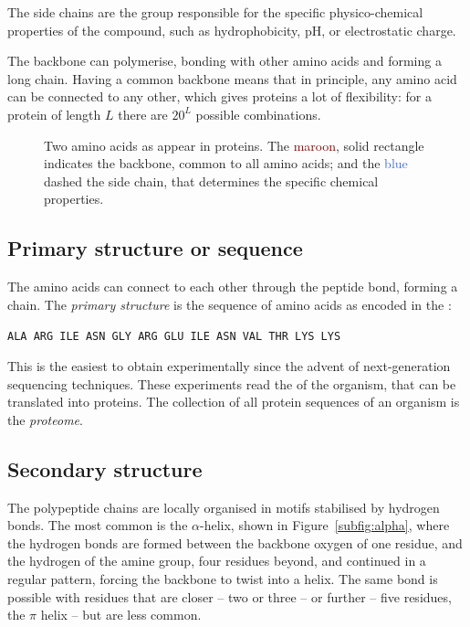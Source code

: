 The side chains are the group responsible for the specific physico-chemical properties of the compound, such as hydrophobicity, pH, or electrostatic charge.

The backbone can polymerise, bonding with other amino acids and forming a long chain.
Having a common backbone means that in principle, any amino acid can be connected to any other, which gives proteins a lot of flexibility:
for a protein of length $L$ there are $20^L$ possible combinations. %

\begin{figure}
\centering
\hfil %
\hfil %
\hfil %
\caption{Two amino acids as appear in proteins.
The \textcolor{Maroon}{maroon}, solid rectangle indicates the backbone, common to all amino acids; and the \textcolor{RoyalBlue}{blue} dashed the side chain, that determines the specific chemical properties.}\label{fig:amino_acids}
\end{figure}

\subsection{Primary structure or sequence}
The amino acids can connect to each other through the peptide bond, forming a chain.
The \emph{primary structure} is the sequence of amino acids as encoded in the \DNA:
\begin{center}
\texttt{ALA ARG ILE ASN GLY ARG GLU ILE ASN VAL THR LYS LYS}
\end{center}


This is the easiest to obtain experimentally since the advent of next-generation sequencing techniques.
These experiments read the \DNA{} of the organism, that can be translated into proteins.
The collection of all protein sequences of an organism is the \emph{proteome}.


\subsection{Secondary structure}
The polypeptide chains are locally organised in motifs stabilised by hydrogen bonds.
The most common is the $\alpha$-helix, \marginpar{$\alpha$} shown in Figure~\ref{subfig:alpha}, where the hydrogen bonds are formed between the backbone oxygen of one residue, and the hydrogen of the amine group, four residues beyond, and continued in a regular pattern, forcing the backbone to twist into a helix.
The same bond is possible with residues that are closer -- two or three -- or further  -- five residues, the $\pi$ helix -- but are less common.

